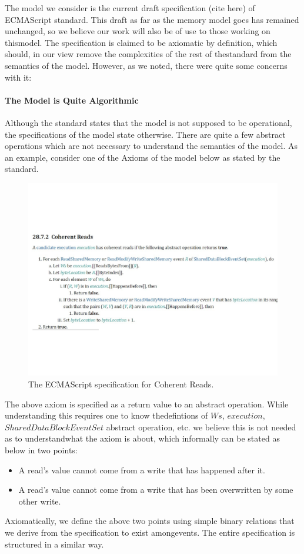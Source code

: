 
The model we consider is the current draft specification (cite here) of ECMAScript standard. 
This draft as far as the memory model goes has remained unchanged, so we believe our work will also be of use to those working on thismodel. 
The specification is claimed to be axiomatic by definition, which should, in our view remove the complexities of the rest of thestandard from the semantics of the model.
However, as we noted, there were quite some concerns with it: 

\paragraph{The Model is Quite Algorithmic}
    Although the standard states that the model is not supposed to be operational, the specifications of the model state otherwise. 
    There are quite a few abstract operations which are not necessary to understand the semantics of the model. 
    As an example, consider one of the Axioms of the model below as stated by the standard. 
    \begin{figure}[H]
        \centering 
        \includegraphics[scale=0.6]{4.ECMAScriptMemoryModel/ECMAScriptStdCoherentReads.pdf}
        \caption{The ECMAScript specification for Coherent Reads.}
    \end{figure}
    The above axiom is specified as a return value to an abstract operation. While understanding this requires one to know thedefintions of $Ws$, $execution$, $SharedDataBlockEventSet$ abstract operation, etc. we believe this is not needed as to understandwhat the axiom is about, which informally can be stated as below in two points:
    \begin{itemize}
        \item A read's value cannot come from a write that has happened after it. 
        \item A read's value cannot come from a write that has been overwritten by some other write.  
    \end{itemize}
    Axiomatically, we define the above two points using simple binary relations that we derive from the specification to exist amongevents. The entire specification is structured in a similar way. 


